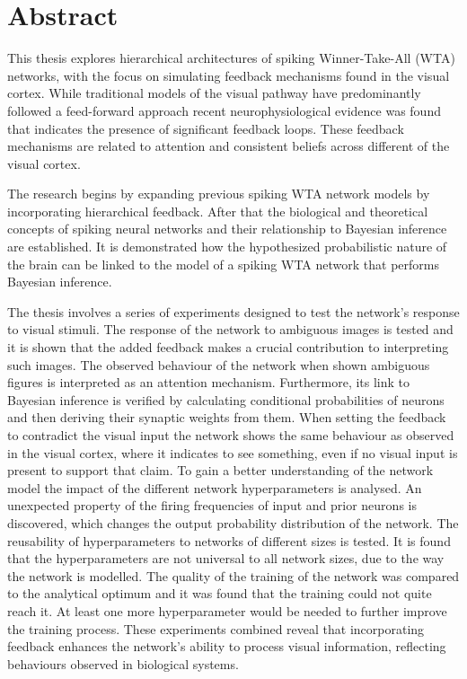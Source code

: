 

\chapter*{Abstract}
\label{cha:abstract}

This thesis explores hierarchical architectures of spiking Winner-Take-All (WTA) networks, with the focus on simulating feedback mechanisms found in the visual cortex. While traditional models of the visual pathway have predominantly followed a feed-forward approach recent neurophysiological evidence was found that indicates the presence of significant feedback loops. These feedback mechanisms are related to attention and consistent beliefs across different of the visual cortex. 

The research begins by expanding previous spiking WTA network models by incorporating hierarchical feedback. After that  the biological and theoretical concepts of spiking neural networks and their relationship to Bayesian inference are established. It is demonstrated how the hypothesized probabilistic nature of the brain can be linked to the model of a spiking WTA network that performs Bayesian inference.

The thesis involves a series of experiments designed to test the network's response to visual stimuli. The response of the network to ambiguous images is tested and it is shown that the added feedback makes a crucial contribution to interpreting such images. The observed behaviour of the network when shown ambiguous figures is interpreted as an attention mechanism. Furthermore, its link to Bayesian inference is verified by calculating conditional probabilities of neurons and then deriving their synaptic weights from them. When setting the feedback to contradict the visual input the network shows the same behaviour as observed in the visual cortex, where it indicates to see something, even if no visual input is present to support that claim. To gain a better understanding of the network model the impact of the different network hyperparameters is analysed. An unexpected property of the firing frequencies of input and prior neurons is discovered, which changes the output probability distribution of the network. The reusability of hyperparameters to networks of different sizes is tested. It is found that the hyperparameters are not universal to all network sizes, due to the way the network is modelled. The quality of the training of the network was compared to the analytical optimum and it was found that the training could not quite reach it. At least one more hyperparameter would be needed to further improve the training process. These experiments combined reveal that incorporating feedback enhances the network's ability to process visual information, reflecting behaviours observed in biological systems.

